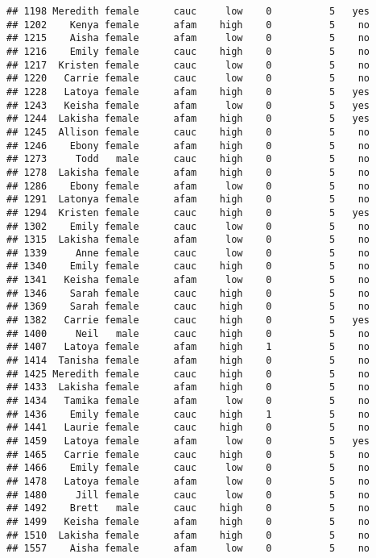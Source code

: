 \documentclass[
]{article}
\begin{document}
\begin{verbatim}
## 1198 Meredith female      cauc     low    0          5   yes
## 1202    Kenya female      afam    high    0          5    no
## 1215    Aisha female      afam     low    0          5    no
## 1216    Emily female      cauc    high    0          5    no
## 1217  Kristen female      cauc     low    0          5    no
## 1220   Carrie female      cauc     low    0          5    no
## 1228   Latoya female      afam    high    0          5   yes
## 1243   Keisha female      afam     low    0          5   yes
## 1244  Lakisha female      afam    high    0          5   yes
## 1245  Allison female      cauc    high    0          5    no
## 1246    Ebony female      afam    high    0          5    no
## 1273     Todd   male      cauc    high    0          5    no
## 1278  Lakisha female      afam    high    0          5    no
## 1286    Ebony female      afam     low    0          5    no
## 1291  Latonya female      afam    high    0          5    no
## 1294  Kristen female      cauc    high    0          5   yes
## 1302    Emily female      cauc     low    0          5    no
## 1315  Lakisha female      afam     low    0          5    no
## 1339     Anne female      cauc     low    0          5    no
## 1340    Emily female      cauc    high    0          5    no
## 1341   Keisha female      afam     low    0          5    no
## 1346    Sarah female      cauc    high    0          5    no
## 1369    Sarah female      cauc    high    0          5    no
## 1382   Carrie female      cauc    high    0          5   yes
## 1400     Neil   male      cauc    high    0          5    no
## 1407   Latoya female      afam    high    1          5    no
## 1414  Tanisha female      afam    high    0          5    no
## 1425 Meredith female      cauc    high    0          5    no
## 1433  Lakisha female      afam    high    0          5    no
## 1434   Tamika female      afam     low    0          5    no
## 1436    Emily female      cauc    high    1          5    no
## 1441   Laurie female      cauc    high    0          5    no
## 1459   Latoya female      afam     low    0          5   yes
## 1465   Carrie female      cauc    high    0          5    no
## 1466    Emily female      cauc     low    0          5    no
## 1478   Latoya female      afam     low    0          5    no
## 1480     Jill female      cauc     low    0          5    no
## 1492    Brett   male      cauc    high    0          5    no
## 1499   Keisha female      afam    high    0          5    no
## 1510  Lakisha female      afam    high    0          5    no
## 1557    Aisha female      afam     low    0          5    no

\end{verbatim}
\end{document}
